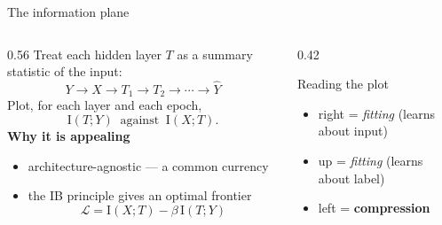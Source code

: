 \documentclass[aspectratio=169,11pt]{beamer}
\newcommand{\I}{\mathrm{I}}
\begin{document}
\begin{frame}{The information plane}
\begin{columns}[T]
\begin{column}{0.56\textwidth}
Treat each hidden layer $T$ as a summary statistic of the input:
\[ Y \to X \to T_1 \to T_2 \to \cdots \to \hat{Y} \]
Plot, for each layer and each epoch,
\[ \I(T;Y) \ \text{ against } \ \I(X;T). \]
\medskip
\textbf{Why it is appealing}
\begin{itemize}
  \item architecture-agnostic --- a common currency
  \item the IB principle gives an optimal frontier
    \[ \mathcal{L} = \I(X;T) - \beta\,\I(T;Y) \]
\end{itemize}
\end{column}
\begin{column}{0.42\textwidth}
\begin{block}{Reading the plot}
\begin{itemize}
  \item[$\rightarrow$] right = \emph{fitting} (learns about input)
  \item[$\uparrow$] up = \emph{fitting} (learns about label)
  \item[$\leftarrow$] left = \textbf{compression}
\end{itemize}
\end{block}
\end{column}
\end{columns}
\end{frame}
\end{document}
